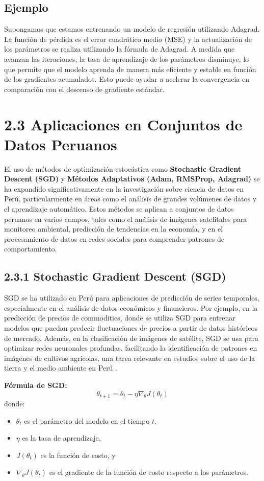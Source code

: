 \documentclass[12pt]{article}
\begin{document}
	\subsection*{Ejemplo}
	
	Supongamos que estamos entrenando un modelo de regresión utilizando Adagrad. La función de pérdida es el error cuadrático medio (MSE) y la actualización de los parámetros se realiza utilizando la fórmula de Adagrad. A medida que avanzan las iteraciones, la tasa de aprendizaje de los parámetros disminuye, lo que permite que el modelo aprenda de manera más eficiente y estable en función de los gradientes acumulados. Esto puede ayudar a acelerar la convergencia en comparación con el descenso de gradiente estándar.
	
\section*{2.3 Aplicaciones en Conjuntos de Datos Peruanos}

El uso de métodos de optimización estocástica como \textbf{Stochastic Gradient Descent (SGD)} y \textbf{Métodos Adaptativos (Adam, RMSProp, Adagrad)} se ha expandido significativamente en la investigación sobre ciencia de datos en Perú, particularmente en áreas como el análisis de grandes volúmenes de datos y el aprendizaje automático. Estos métodos se aplican a conjuntos de datos peruanos en varios campos, tales como el análisis de imágenes satelitales para monitoreo ambiental, predicción de tendencias en la economía, y en el procesamiento de datos en redes sociales para comprender patrones de comportamiento.

\subsection*{2.3.1 Stochastic Gradient Descent (SGD)}
SGD se ha utilizado en Perú para aplicaciones de predicción de series temporales, especialmente en el análisis de datos económicos y financieros. Por ejemplo, en la predicción de precios de commodities, donde se utiliza SGD para entrenar modelos que puedan predecir fluctuaciones de precios a partir de datos históricos de mercado. Además, en la clasificación de imágenes de satélite, SGD se usa para optimizar redes neuronales profundas, facilitando la identificación de patrones en imágenes de cultivos agrícolas, una tarea relevante en estudios sobre el uso de la tierra y el medio ambiente en Perú \cite{Bottou2010}.

\textbf{Fórmula de SGD:}
\[
\theta_{t+1} = \theta_t - \eta \nabla_\theta J(\theta_t)
\]
donde:
\begin{itemize}
	\item \(\theta_t\) es el parámetro del modelo en el tiempo \(t\),
	\item \(\eta\) es la tasa de aprendizaje,
	\item \(J(\theta_t)\) es la función de costo, y
	\item \(\nabla_\theta J(\theta_t)\) es el gradiente de la función de costo respecto a los parámetros.
\end{itemize}
\end{document}
